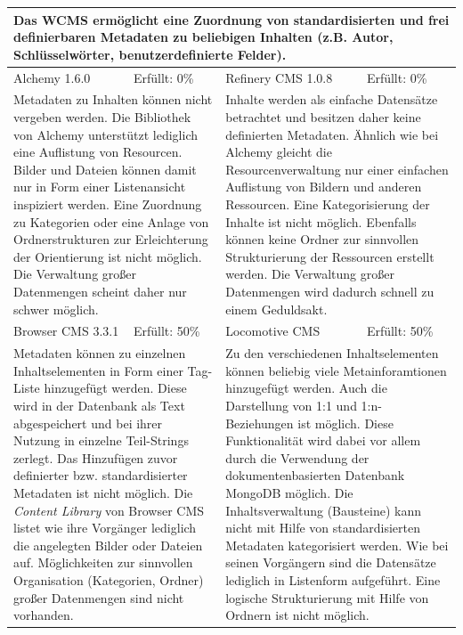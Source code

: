 \begin{tabular}[!ht]{|l|l|l|l|}
\hline
\multicolumn{4}{|p{15cm}|}{\textbf{Das WCMS ermöglicht eine Zuordnung von standardisierten und frei definierbaren Metadaten zu beliebigen Inhalten (z.B. Autor, Schlüsselwörter, benutzerdefinierte Felder).}} \\
\hline
  Alchemy 1.6.0 & \cellcolor{red}Erfüllt: 0\% & Refinery CMS 1.0.8 & \cellcolor{red}Erfüllt: 0\% \\
  \hline
  \multicolumn{2}{|p{7.5cm}|}{Metadaten zu Inhalten können nicht vergeben werden. Die Bibliothek von Alchemy unterstützt lediglich eine Auflistung von Resourcen. Bilder und Dateien können damit nur in Form einer Listenansicht inspiziert werden. Eine Zuordnung zu Kategorien oder eine Anlage von Ordnerstrukturen zur Erleichterung der Orientierung ist nicht möglich. Die Verwaltung großer Datenmengen scheint daher nur schwer möglich.}
   & \multicolumn{2}{p{7.5cm}|}{Inhalte werden als einfache Datensätze betrachtet und besitzen daher keine definierten Metadaten. Ähnlich wie bei Alchemy gleicht die Resourcenverwaltung nur einer einfachen Auflistung von Bildern und anderen Ressourcen. Eine Kategorisierung der Inhalte ist nicht möglich. Ebenfalls können keine Ordner zur sinnvollen Strukturierung der Ressourcen erstellt werden. Die Verwaltung großer Datenmengen wird dadurch schnell zu einem Geduldsakt.} \\
  \hline
  Browser CMS 3.3.1 & \cellcolor{yellow}Erfüllt: 50\% & Locomotive CMS & \cellcolor{yellow}Erfüllt: 50\% \\
  \hline
  \multicolumn{2}{|p{7.5cm}|}{Metadaten können zu einzelnen Inhaltselementen in Form einer Tag-Liste hinzugefügt werden. Diese wird in der Datenbank als Text abgespeichert und bei ihrer Nutzung in einzelne Teil-Strings zerlegt. Das Hinzufügen zuvor definierter bzw. standardisierter Metadaten ist nicht möglich. Die \emph{Content Library} von Browser CMS listet wie ihre Vorgänger lediglich die angelegten Bilder oder Dateien auf. Möglichkeiten zur sinnvollen Organisation (Kategorien, Ordner) großer Datenmengen sind nicht vorhanden.} & \multicolumn{2}{p{7.5cm}|}{Zu den verschiedenen Inhaltselementen können beliebig viele Metainforamtionen hinzugefügt werden. Auch die Darstellung von 1:1 und 1:n-Beziehungen ist möglich. Diese Funktionalität wird dabei vor allem durch die Verwendung der dokumentenbasierten Datenbank MongoDB möglich. Die Inhaltsverwaltung (Bausteine) kann nicht mit Hilfe von standardisierten Metadaten kategorisiert werden. Wie bei seinen Vorgängern sind die Datensätze lediglich in Listenform aufgeführt. Eine logische Strukturierung mit Hilfe von Ordnern ist nicht möglich.} \\
\hline
\end{tabular}
